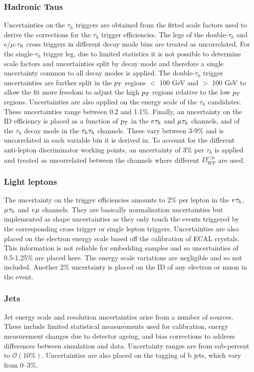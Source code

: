 \subsubsection{Hadronic Taus}
Uncertainties on the $\tau_h$ triggers are obtained from the fitted scale factors used to derive the corrections for the $\tau_h$ trigger efficiencies.
The legs of the double-$\tau_h$ and e/$\mu$-$\tau_{h}$ cross triggers in different decay mode bins are treated as uncorrelated.
For the single-$\tau_h$ trigger leg, due to limited statistics it is not possible to determine scale factors and uncertainties split by decay mode and therefore a single uncertainty common to all decay modes is applied.
The double-$\tau_h$ trigger uncertainties are further split in the $p_{T}$ regions $<$ 100 GeV and $>$ 100 GeV to allow the fit more freedom to adjust the high $p_{T}$ regions relative to the low $p_{T}$ regions.
Uncertainties are also applied on the energy scale of the $\tau_h$ candidates. 
These uncertainties range between 0.2 and 1.1\%. 
Finally, an uncertainty on the ID efficiency is placed as a function of $p_{T}$ in the $e_{}\tau_{h}$ and $\mu_{}\tau_{h}$ channels, and of the $\tau_h$ decay mode in the $\tau_{h}\tau_{h}$ channels. 
These vary between 3-9\% and is uncorrelated in each variable bin it is derived in.
To account for the different anti-lepton discriminator working points, an uncertainty of 3\% per $\tau_h$ is applied and treated as uncorrelated between the channels where different $D_{\text{WP}}^{e/\mu}$ are used.

\subsubsection{Light leptons}
The uncertainty on the trigger efficiencies amounts to 2\% per lepton in the $e_{}\tau_{h}$, $\mu_{}\tau_{h}$ and $e_{}\mu_{}$ channels.
They are basically normalisation uncertainties but implemented as shape uncertainties as they only touch the events triggered by the corresponding cross trigger or single lepton triggers.
Uncertainties are also placed on the electron energy scale based off the calibration of ECAL crystals.
This information is not reliable for embedding samples and so uncertainties of 0.5-1.25\% are placed here. 
The energy scale variations are negligible and so not included.
Another 2\% uncertainty is placed on the ID of any electron or muon in the event.

\subsubsection{Jets}
Jet energy scale and resolution uncertainties arise from a number of sources. 
These include limited statistical measurements used for calibration, energy measurement changes due to detector ageing, and bias corrections to address differences between simulation and data. 
Uncertainty ranges are from sub-percent to $\mathcal{O}(10\%)$.
Uncertainties are also placed on the tagging of b jets, which vary from 0--3\%.

